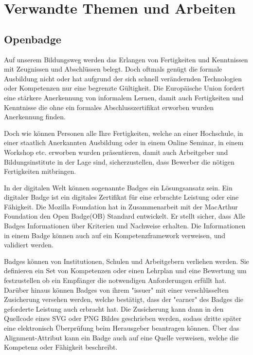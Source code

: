 \section{Verwandte Themen und Arbeiten}\label{similar_topics}

\subsection{Openbadge}\label{openbadge}

Auf unserem Bildungsweg werden das Erlangen von Fertigkeiten und Kenntnissen mit Zeugnissen und Abschlüssen belegt. Doch oftmals genügt die formale Ausbildung nicht oder hat aufgrund der sich schnell verändernden Technologien oder Kompetenzen nur eine begrenzte Gültigkeit.  
Die Europäische Union fordert eine stärkere Anerkennung von informalem Lernen, damit auch Fertigkeiten und Kenntnisse die ohne ein formales Abschlusszertifikat erworben wurden Anerkennung finden.\cite{Dorn2014}

Doch wie können Personen alle Ihre Fertigkeiten, welche an einer Hochschule, in einer staatlich Anerkannten Ausbildung oder  in einem Online Seminar, in einem Workshop etc. erworben wurden präsentieren, damit auch Arbeitgeber und Bildungsinstitute in der Lage sind, sicherzustellen, dass Bewerber die nötigen Fertigkeiten mitbringen.\cite{alliance_for_excellent_education}

In der digitalen Welt können sogenannte Badges ein Lösungsansatz sein. Ein digitaler Badge ist ein digitales Zertifikat für eine erbrachte Leistung oder eine Fähigkeit. 
Die Mozilla Foundation hat in Zusammenarbeit mit der MacArthur Foundation den Open Badge(OB) Standard entwickelt. Er stellt sicher, dass Alle Badges Informationen über Kriterien und Nachweise erhalten. Die Informationen in einem Badge können auch auf ein Kompetenzframework verweisen, und validiert werden.\cite[4]{alliance_for_excellent_education}

\vspace{1em}

Badges können von Institutionen, Schulen und Arbeitgebern verliehen werden. Sie definieren ein Set von Kompetenzen oder einen Lehrplan und eine Bewertung um festzustellen ob ein Empfänger die notwendigen Anforderungen erfüllt hat. Darüber hinaus können Badges von ihrem "issuer" mit einer verschlüsselten Zusicherung versehen werden, welche bestätigt, dass der "earner" des Badges die geforderte Leistung auch erbracht hat. 
Die Zusicherung kann dann in den Quellcode eines SVG oder PNG Bildes geschrieben werden, sodass dritte später eine elektronisch Überprüfung beim Herausgeber beantragen können. Über das Alignment-Attribut kann ein Badge auch auf eine Quelle verweisen, welche die Kompetenz oder Fähigkeit beschreibt.

